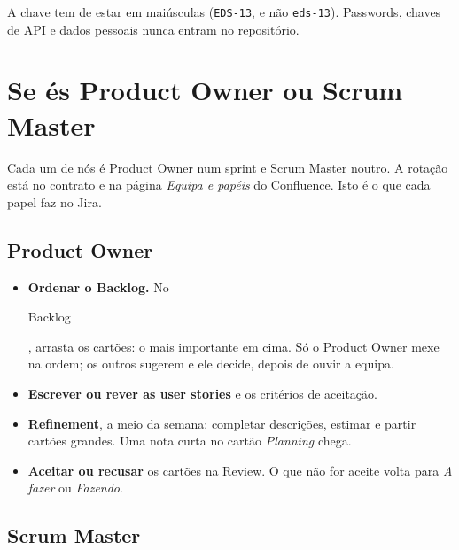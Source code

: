 \documentclass[11pt,a4paper]{article}
\newcommand{\btn}[1]{{\setlength{\fboxsep}{1.6pt}\colorbox{azulclaro}{\sffamily\small\strut #1}}}
\begin{document}
A chave tem de estar em maiúsculas (\texttt{EDS-13}, e não \texttt{eds-13}). Passwords, chaves de API e dados pessoais nunca entram no repositório.

\section{Se és Product Owner ou Scrum Master}

Cada um de nós é Product Owner num sprint e Scrum Master noutro. A rotação está no contrato e na página \textit{Equipa e papéis} do Confluence. Isto é o que cada papel faz no Jira.

\subsection{Product Owner}

\begin{itemize}
  \item \textbf{Ordenar o Backlog.} No \btn{Backlog}, arrasta os cartões: o mais importante em cima. Só o Product Owner mexe na ordem; os outros sugerem e ele decide, depois de ouvir a equipa.
  \item \textbf{Escrever ou rever as user stories} e os critérios de aceitação.
  \item \textbf{Refinement}, a meio da semana: completar descrições, estimar e partir cartões grandes. Uma nota curta no cartão \textit{Planning} chega.
  \item \textbf{Aceitar ou recusar} os cartões na Review. O que não for aceite volta para \textit{A fazer} ou \textit{Fazendo}.
\end{itemize}

\subsection{Scrum Master}
\end{document}
